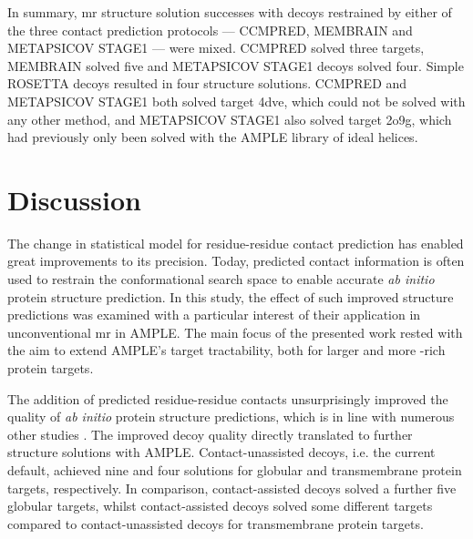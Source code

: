 In summary, \gls{mr} structure solution successes with decoys restrained by either of the three contact prediction protocols --- CCMPRED, MEMBRAIN and METAPSICOV STAGE1 --- were mixed. CCMPRED solved three targets, MEMBRAIN solved
five and METAPSICOV STAGE1 decoys solved four. Simple ROSETTA decoys resulted in four structure solutions. CCMPRED and METAPSICOV STAGE1 both solved target 4dve, which could not be solved with any other method, and METAPSICOV STAGE1 also solved target 2o9g, which had previously only been solved with the AMPLE library of ideal helices.

\section{Discussion}
The change in statistical model for residue-residue contact prediction has enabled great improvements to its precision. Today, predicted contact information is often used to restrain the conformational search space to enable accurate \textit{ab initio} protein structure prediction. In this study, the effect of such improved structure predictions was examined with a particular interest of their application in unconventional \gls{mr} in AMPLE. The main focus of the presented work rested with the aim to extend AMPLE's target tractability, both for larger and more \textbeta-rich protein targets.

The addition of predicted residue-residue contacts unsurprisingly improved the quality of \textit{ab initio} protein structure predictions, which is in line with numerous other studies \cite[e.g.,][]{Marks2011-os,Michel2014-eg,Kosciolek2014-bt,Ovchinnikov2015-tn,Ovchinnikov2016-jj,Michel2017-xh,De_Oliveira2018-sg,Ovchinnikov2017-nd,Wang2017-rx,Dos_Santos2018-lq}. The improved decoy quality directly translated to further structure solutions with AMPLE. Contact-unassisted decoys, i.e. the current default, achieved nine and four solutions for globular and transmembrane protein targets, respectively. In comparison, contact-assisted decoys solved a further five globular targets, whilst contact-assisted decoys solved some different targets compared to contact-unassisted decoys for transmembrane protein targets.

